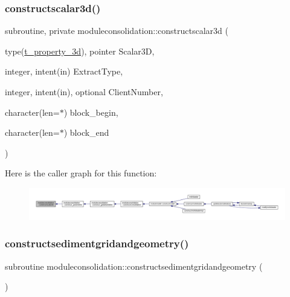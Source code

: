 \subsubsection{\texorpdfstring{constructscalar3d()}{constructscalar3d()}}
{\footnotesize\ttfamily subroutine, private moduleconsolidation\+::constructscalar3d (\begin{DoxyParamCaption}\item[{type(\mbox{\hyperlink{structmoduleconsolidation_1_1t__property__3d}{t\+\_\+property\+\_\+3d}}), pointer}]{Scalar3D,  }\item[{integer, intent(in)}]{Extract\+Type,  }\item[{integer, intent(in), optional}]{Client\+Number,  }\item[{character(len=$\ast$)}]{block\+\_\+begin,  }\item[{character(len=$\ast$)}]{block\+\_\+end }\end{DoxyParamCaption})\hspace{0.3cm}{\ttfamily [private]}}

Here is the caller graph for this function\+:\nopagebreak
\begin{figure}[H]
\begin{center}
\leavevmode
\includegraphics[width=350pt]{namespacemoduleconsolidation_af867c8406bedea1eef3287708029fa21_icgraph}
\end{center}
\end{figure}
\mbox{\label{namespacemoduleconsolidation_a7fa231a9af605419b5dbc619d4e2a60f}} 
\subsubsection{\texorpdfstring{constructsedimentgridandgeometry()}{constructsedimentgridandgeometry()}}
{\footnotesize\ttfamily subroutine moduleconsolidation\+::constructsedimentgridandgeometry (\begin{DoxyParamCaption}{ }\end{DoxyParamCaption})\hspace{0.3cm}{\ttfamily [private]}}

